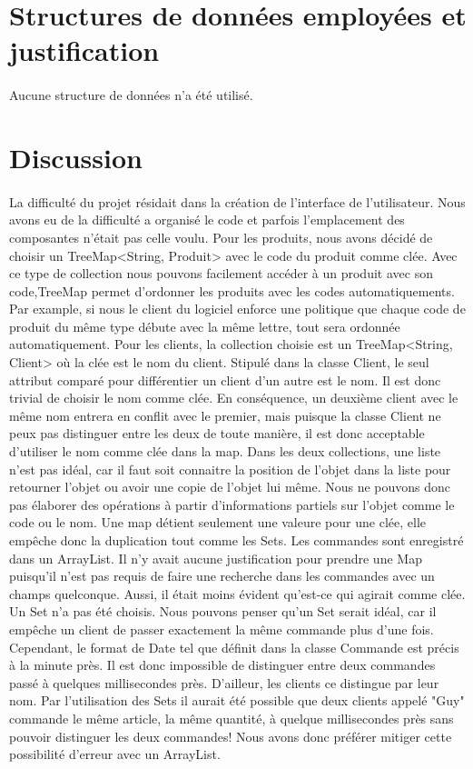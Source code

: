 \documentclass[11pt, french]{article} %
\begin{document}
\section{Structures de données employées et justification}
\paragraph{}
Aucune structure de données n'a été utilisé.


\section{Discussion}
\paragraph{}
La difficulté du projet résidait dans la création de l'interface de l'utilisateur. Nous avons eu de la difficulté a organisé le code et parfois l'emplacement des composantes n'était pas celle voulu. Pour les produits, nous avons décidé de choisir un TreeMap<String, Produit> avec le code du produit comme clée. Avec ce type de collection nous pouvons facilement accéder à un produit avec son code,TreeMap permet d'ordonner les produits avec les codes automatiquements. Par example, si nous le client du logiciel enforce une politique que chaque code de produit du même type débute avec la même lettre, tout sera ordonnée automatiquement. Pour les clients, la collection choisie est un TreeMap<String, Client> où la clée est le nom du client. Stipulé dans la classe Client, le seul attribut comparé pour différentier un client d'un autre est le nom. Il est donc trivial de choisir le nom comme clée. En conséquence, un deuxième client avec le même nom entrera en conflit avec le premier, mais puisque la classe Client ne peux pas distinguer entre les deux de toute manière, il est donc acceptable d'utiliser le nom comme clée dans la map. Dans les deux collections, une liste n'est pas idéal, car il faut soit connaitre la position de l'objet dans la liste pour retourner l'objet ou avoir une copie de l'objet lui même. Nous ne pouvons donc pas élaborer des opérations à partir d'informations partiels sur l'objet comme le code ou le nom. Une map détient seulement une valeure pour une clée, elle empêche donc la duplication tout comme les Sets. Les commandes sont enregistré dans un ArrayList. Il n'y avait aucune justification pour prendre une Map puisqu'il n'est pas requis de faire une recherche dans les commandes avec un champs quelconque. Aussi, il était moins évident qu'est-ce qui agirait comme clée. Un Set n'a pas été choisis. Nous pouvons penser qu'un Set serait idéal, car il empêche un client de passer exactement la même commande plus d'une fois. Cependant, le format de Date tel que définit dans la classe Commande est précis à la minute près. Il est donc impossible de distinguer entre deux commandes passé à quelques millisecondes près. D'ailleur, les clients ce distingue par leur nom. Par l'utilisation des Sets il aurait été possible que deux clients appelé "Guy" commande le même article, la même quantité, à quelque millisecondes près sans pouvoir distinguer les deux commandes! Nous avons donc préférer mitiger cette possibilité d'erreur avec un ArrayList.
\end{document}
